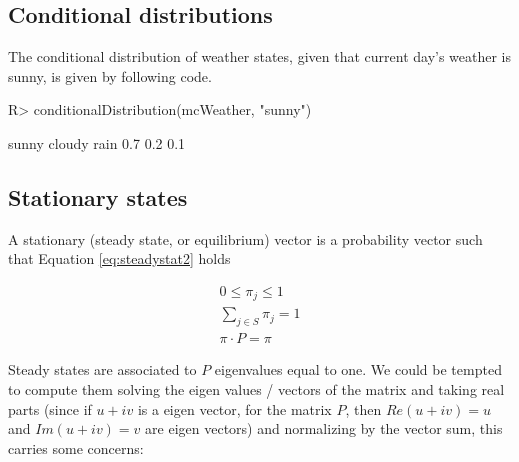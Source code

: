 \documentclass[
  nojss]{jss}
\begin{document}
\hypertarget{conditional-distributions}{%
\subsection{Conditional distributions}\label{conditional-distributions}}

The conditional distribution of weather states, given that current day's weather
is sunny, is given by following code.

\begin{CodeChunk}

\begin{CodeInput}
R> conditionalDistribution(mcWeather, "sunny")
\end{CodeInput}

\begin{CodeOutput}
 sunny cloudy   rain 
   0.7    0.2    0.1 
\end{CodeOutput}
\end{CodeChunk}

\hypertarget{stationary-states}{%
\subsection{Stationary states}\label{stationary-states}}

A stationary (steady state, or equilibrium) vector is a probability vector such that Equation \ref{eq:steadystat2} holds

\begin{equation}
\begin{matrix}
0\leq \pi_j \leq 1\\ 
\sum_{j \in S} \pi_j = 1\\ 
\pi \cdot P = \pi
\end{matrix}
\label{eq:steadystat2}
\end{equation}

Steady states are associated to \(P\) eigenvalues equal to one. We could be tempted to compute them
solving the eigen values / vectors of the matrix and taking real parts (since if \(u + iv\) is a eigen vector, for the matrix \(P\), then \(Re(u + iv) = u\) and \(Im(u + iv) = v\) are eigen vectors) and normalizing by the vector sum, this carries some concerns:
\end{document}
